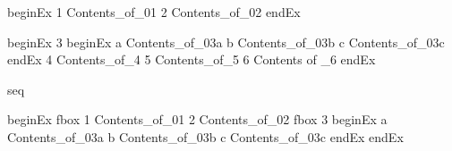 beginEx
1
Contents_of_01
2
Contents_of_02
endEx
\begin{instructions}
\GCALCI%
\end{instructions}
beginEx
3
beginEx
a
Contents_of_03a
b
Contents_of_03b
c
Contents_of_03c
endEx
4
Contents_of_4
5
Contents_of_5
6
Contents of _6
endEx

seq

beginEx
fbox 1
Contents_of_01
2
Contents_of_02
fbox 3
beginEx
a
Contents_of_03a
b
Contents_of_03b
c
Contents_of_03c
endEx
endEx


